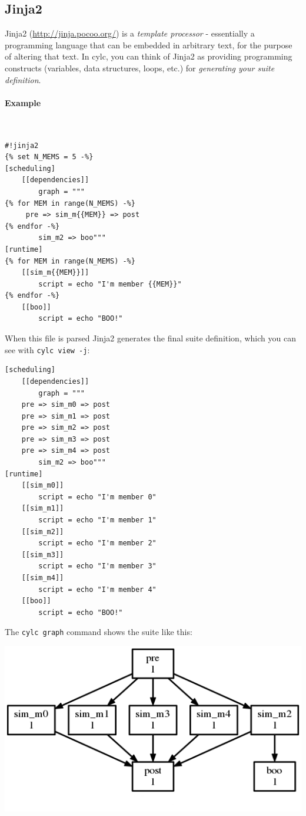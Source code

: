 \subsection{Jinja2}

Jinja2 (\url{http://jinja.pocoo.org/}) is a {\em template processor} -
essentially a programming language that can be embedded in arbitrary text,
for the purpose of altering that text.  In cylc, you can think of
Jinja2 as providing programming constructs (variables, data structures,
loops, etc.) for {\em generating your suite definition}.

\paragraph{Example} $ $

\begin{lstlisting}
#!jinja2
{% set N_MEMS = 5 -%}
[scheduling]
    [[dependencies]]
        graph = """
{% for MEM in range(N_MEMS) -%}
     pre => sim_m{{MEM}} => post
{% endfor -%}
        sim_m2 => boo"""
[runtime]
{% for MEM in range(N_MEMS) -%}
    [[sim_m{{MEM}}]]
        script = echo "I'm member {{MEM}}"
{% endfor -%}
    [[boo]]
        script = echo "BOO!"
\end{lstlisting}

When this file is parsed Jinja2 generates the final suite definition, which
you can see with \lstinline=cylc view -j=:
\begin{lstlisting}
[scheduling]
    [[dependencies]]
        graph = """
    pre => sim_m0 => post
    pre => sim_m1 => post
    pre => sim_m2 => post
    pre => sim_m3 => post
    pre => sim_m4 => post
        sim_m2 => boo"""
[runtime]
    [[sim_m0]]
        script = echo "I'm member 0"
    [[sim_m1]]
        script = echo "I'm member 1"
    [[sim_m2]]
        script = echo "I'm member 2"
    [[sim_m3]]
        script = echo "I'm member 3"
    [[sim_m4]]
        script = echo "I'm member 4"
    [[boo]]
        script = echo "BOO!"
\end{lstlisting}

The \lstinline=cylc graph= command shows the suite like this:
\begin{center}
\includegraphics[width=0.5\columnwidth]{resources/jinja2-param.png}
\end{center}

